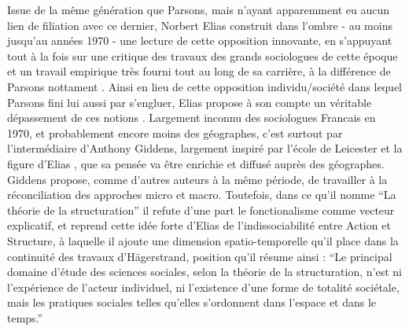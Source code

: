 
Issue de la même génération que Parsons, mais n'ayant apparemment eu aucun lien de filiation avec ce dernier, Norbert Elias construit dans l'ombre - au moins jusqu'au années 1970 - une lecture de cette opposition innovante, en s'appuyant tout à la fois sur une critique des travaux des grands sociologues de cette époque et un travail empirique très fourni tout au long de sa carrière, à la différence de Parsons nottament \autocite{Mennell1989}. Ainsi en lieu de cette opposition individu/société dans lequel Parsons fini lui aussi par s'engluer, Elias propose à son compte un véritable dépassement de ces notions \autocite[94-101]{Heinich2002}. Largement inconnu des sociologues Francais en 1970, et probablement encore moins des géographes, c'est surtout par l'intermédiaire d'Anthony Giddens, largement inspiré par l'école de Leicester et la figure d'Elias \autocite[172-178]{Dunning2013}, que sa pensée va être enrichie et diffusé auprès des géographes. Giddens propose, comme d'autres auteurs à la même période, de travailler à la réconciliation des approches micro et macro. Toutefois, dans ce qu'il nomme \enquote{La théorie de la structuration} il refute d'une part le fonctionalisme comme vecteur explicatif, et reprend cette idée forte d'Elias de l'indissociabilité entre Action et Structure, à laquelle il ajoute une dimension spatio-temporelle qu'il place dans la continuité des travaux d'Hägerstrand, position qu'il résume ainsi : \enquote{Le principal domaine d’étude des sciences sociales, selon la théorie de la structuration, n’est ni l’expérience de l’acteur individuel, ni l’existence d’une forme de totalité sociétale, mais les pratiques sociales telles qu’elles s’ordonnent dans l’espace et dans le temps.} \autocite[2]{Giddens1984, Giddens1987}

